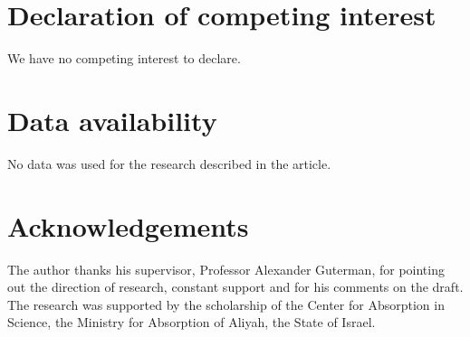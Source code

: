 \documentclass{elsarticle}
\def\ucsign{\bcpanchant}
\newenvironment{underconst}{\begin{mybox}\par\noindent\hangindent=2em\hangafter=-2
  \smash{\hbox to0pt{\hskip-\hangindent
    \lower1.5\baselineskip\hbox{\ucsign}\hfill}}
    }{\end{mybox}}
\DeclareMathOperator{\id}{id}
\DeclareMathOperator{\rad}{rad}
\def\F{{\mathbb F}}
\theoremstyle{definition}
\numberwithin{equation}{section}
\begin{document}
%
%
%
%
%
%
%

\section{Declaration of competing interest}
We have no competing interest to declare.

\section{Data availability}
No data was used for the research described in the article.


\section*{Acknowledgements}

The author thanks his supervisor, Professor Alexander Guterman,  for pointing out the direction of research, constant support and for his comments on the draft. The research was supported by the scholarship of the Center for Absorption in Science, the Ministry for Absorption of Aliyah, the State of Israel.



\end{document}
